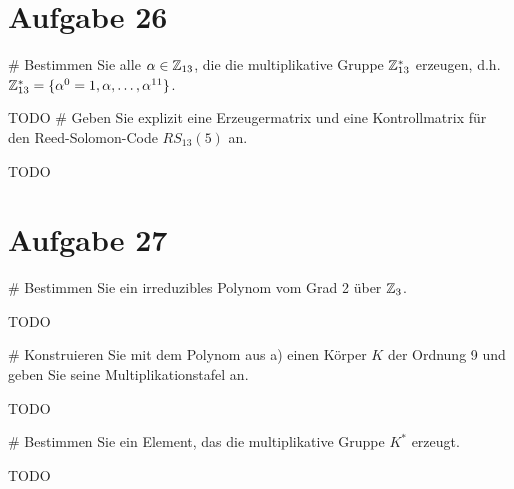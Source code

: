 \section*{Aufgabe 26}
\begin{myList}
#
Bestimmen Sie alle $\alpha \in \mathbb{Z}_{13}$, die die multiplikative Gruppe $\mathbb{Z}_{13}^{\ast}$ erzeugen, d.h. $\mathbb{Z}_{13}^{\ast} = \lbrace \alpha^0 = 1,\alpha,\ldots,\alpha^{11} \rbrace$.
\medskip

TODO
#
Geben Sie explizit eine Erzeugermatrix und eine Kontrollmatrix für den Reed-Solomon-Code $RS_{13}(5)$ an.\medskip

TODO
\end{myList}

\section*{Aufgabe 27}
\begin{myList}
#
Bestimmen Sie ein irreduzibles Polynom vom Grad 2 über $\mathbb{Z}_3$.\medskip

TODO

#
Konstruieren Sie mit dem Polynom aus a) einen Körper $K$ der Ordnung 9 und geben Sie seine Multiplikationstafel an.\medskip

TODO

#
Bestimmen Sie ein Element, das die multiplikative Gruppe $K^{\ast}$ erzeugt.\medskip

TODO
\end{myList}

